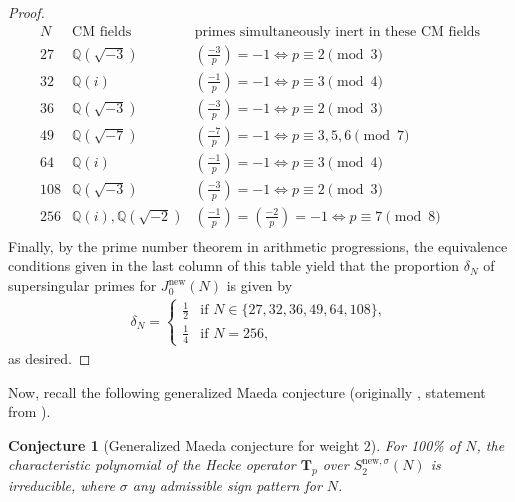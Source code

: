 \documentclass[11pt,letterpaper,reqno]{amsart}
\newtheorem{conjecture}[theorem]{Conjecture}
\theoremstyle{definition}
\numberwithin{equation}{section}
\numberwithin{figure}{section}
\numberwithin{table}{section}
\newcommand{\lrp}[1]{\!\left(#1\right)}
\newcommand{\QQ}{\mathbb{Q}}
\newcommand{\nw}{\mathrm{new}}
\begin{document}
\begin{proof}
\begin{equation}
\begin{array}{c|c|c}
N & \text{CM fields} & \text{primes simultaneously inert in these CM fields} 
\\
\hline
27  & \QQ(\sqrt{-3}) & \lrp{\frac{-3}{p}}=-1 \iff p \equiv 2 \pmod 3   \\
32  & \QQ(i)         & \lrp{\frac{-1}{p}}=-1 \iff p \equiv 3 \pmod 4 \\
36  & \QQ(\sqrt{-3}) & \lrp{\frac{-3}{p}}=-1 \iff p \equiv 2 \pmod 3 \\
49  & \QQ(\sqrt{-7}) & \lrp{\frac{-7}{p}}=-1 \iff p \equiv 3,5,6 \pmod 7 \\
64  & \QQ(i)         & \lrp{\frac{-1}{p}}=-1 \iff p \equiv 3 \pmod 4 \\
108 & \QQ(\sqrt{-3}) & \lrp{\frac{-3}{p}}=-1 \iff p \equiv 2 \pmod 3 \\
256 & \QQ(i),\QQ(\sqrt{-2})  & \lrp{\frac{-1}{p}}=\lrp{\frac{-2}{p}}=-1 \iff p \equiv 7 \pmod 8 \\
\end{array}
\end{equation}
    Finally, by the prime number theorem in arithmetic progressions, the equivalence conditions given in the last column of this table yield that the proportion $\delta_N$ of supersingular primes for $J_0^\nw(N)$ is given by
    \begin{align}
        \delta_N = 
        \begin{cases}
            \frac{1}{2} & \text{if } N \in \{27,32,36,49,64,108\}, \\
            \frac{1}{4} & \text{if } N=256,
        \end{cases}
    \end{align}
    as desired.
\end{proof}








Now, recall the following generalized Maeda conjecture (originally \cite[Conjecture A]{Kimball2021}, statement from \cite[Conjecture 4.14]{KMRX}).

\begin{conjecture}[Generalized Maeda conjecture for weight $2$] \label{conj:gen-Maeda}
    For 100\% of $N$, the characteristic polynomial of the Hecke operator $\mathbf{T}_p$ over $S_2^{\nw, \sigma}(N)$ is irreducible, where $\sigma$ any admissible sign pattern for $N$.
 \end{conjecture}
\end{document}

